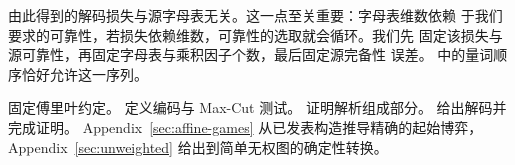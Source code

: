 由此得到的解码损失与源字母表无关。这一点至关重要：字母表维数依赖
于我们要求的可靠性，若损失依赖维数，可靠性的选取就会循环。我们先
固定该损失与源可靠性，再固定字母表与乘积因子个数，最后固定源完备性
误差。 中的量词顺序恰好允许这一序列。

 固定傅里叶约定。
 定义编码与 Max-Cut 测试。
 证明解析组成部分。
 给出解码并完成证明。
Appendix~\ref{sec:affine-games} 从已发表构造推导精确的起始博弈，
Appendix~\ref{sec:unweighted} 给出到简单无权图的确定性转换。
